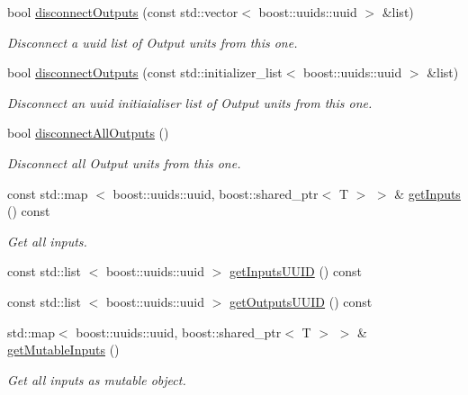 \begin{DoxyCompactItemize}
bool \hyperlink{classcryomesh_1_1common_1_1Connector_a5a6ab355b767129f60f4042a734e1db0}{disconnect\-Outputs} (const std\-::vector$<$ boost\-::uuids\-::uuid $>$ \&list)
\begin{DoxyCompactList}\small\item\em \-Disconnect a uuid list of \-Output units from this one. \end{DoxyCompactList}\item 
bool \hyperlink{classcryomesh_1_1common_1_1Connector_adb34713ed33984fef703a8a1ad342624}{disconnect\-Outputs} (const std\-::initializer\-\_\-list$<$ boost\-::uuids\-::uuid $>$ \&list)
\begin{DoxyCompactList}\small\item\em \-Disconnect an uuid initiaialiser list of \-Output units from this one. \end{DoxyCompactList}\item 
bool \hyperlink{classcryomesh_1_1common_1_1Connector_afff7a004da2146ab0fca902204bd62ee}{disconnect\-All\-Outputs} ()
\begin{DoxyCompactList}\small\item\em \-Disconnect all \-Output units from this one. \end{DoxyCompactList}\item 
const std\-::map\*
$<$ boost\-::uuids\-::uuid, \*
boost\-::shared\-\_\-ptr$<$ \-T $>$ $>$ \& \hyperlink{classcryomesh_1_1common_1_1Connector_af294647fe03f03108b2edd81c11aaa0a}{get\-Inputs} () const 
\begin{DoxyCompactList}\small\item\em \-Get all inputs. \end{DoxyCompactList}\item 
const std\-::list\*
$<$ boost\-::uuids\-::uuid $>$ \hyperlink{classcryomesh_1_1common_1_1Connector_acd6f00383ee6fd73ef8374494ce09865}{get\-Inputs\-U\-U\-I\-D} () const 
\item 
const std\-::list\*
$<$ boost\-::uuids\-::uuid $>$ \hyperlink{classcryomesh_1_1common_1_1Connector_acccc3d12685c44062af17cf5d7d78b6a}{get\-Outputs\-U\-U\-I\-D} () const 
\item 
std\-::map$<$ boost\-::uuids\-::uuid, \*
boost\-::shared\-\_\-ptr$<$ \-T $>$ $>$ \& \hyperlink{classcryomesh_1_1common_1_1Connector_a673488ae2b7b9c00658bf4e4b99b26f2}{get\-Mutable\-Inputs} ()
\begin{DoxyCompactList}\small\item\em \-Get all inputs as mutable object. \end{DoxyCompactList}\item 

\end{DoxyCompactItemize}
